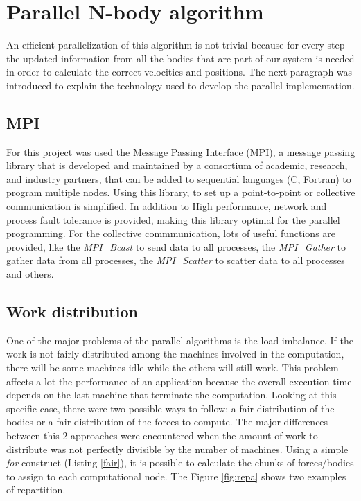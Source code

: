 \documentclass[a4paper]{article}
\begin{document}
\section{Parallel N-body algorithm}
\label{sec:par}
An efficient parallelization of this algorithm is not trivial because for every step the updated information from all the bodies that are part of our system is needed in order to calculate the correct velocities and positions. The next paragraph was introduced to explain the technology used to develop the parallel implementation.

\subsection{MPI}
\label{sec:mpi}
For this project was used the Message Passing Interface (MPI), a message passing library that is developed and maintained by a consortium of academic, research, and industry partners, that can be added to sequential languages (C, Fortran) to program multiple nodes. Using this library, to set up a point-to-point or collective communication is simplified. In addition to High performance, network and process fault tolerance is provided, making this library optimal for the parallel programming. For the collective commmunication, lots of useful functions are provided, like the \textit{MPI\_Bcast} to send data to all processes, the \textit{MPI\_Gather} to gather data from all processes, the \textit{MPI\_Scatter} to scatter data to all processes and others.

\subsection{Work distribution}
\label{sec:bodies_distr}
One of the major problems of the parallel algorithms is the load imbalance. If the work is not fairly distributed among the machines involved in the computation, there will be some machines idle while the others will still work. This problem affects a lot the performance of an application because the overall execution time depends on the last machine that terminate the computation. 
Looking at this specific case, there were two possible ways to follow: a fair distribution of the bodies or a fair distribution of the forces to compute. The major differences between this 2 approaches were encountered when the amount of work to distribute was not perfectly divisible by the number of machines.
Using a simple \textit{for} construct (Listing \ref{fair}), it is possible to calculate the chunks of forces/bodies to assign to each computational node. The Figure \ref{fig:repa} shows two examples of repartition.
\end{document}
